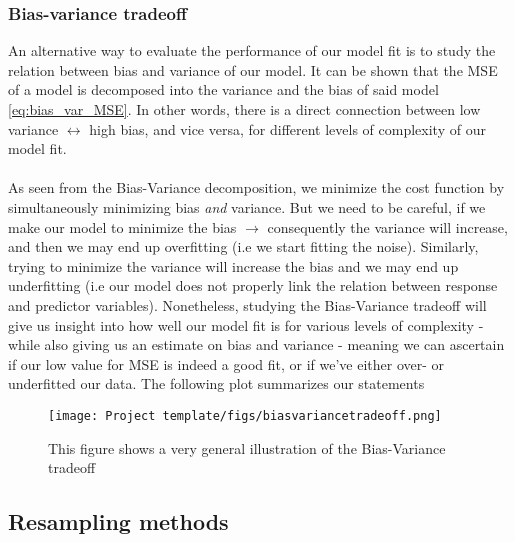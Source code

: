\documentclass[../main.tex]{subfiles}
\begin{document}
\subsubsection{Bias-variance tradeoff}\label{refmethod:Bias_variance_tradeoff}
An alternative way to evaluate the performance of our model fit is to study the relation between bias and variance of our model. It can be shown that the MSE of a model is decomposed into the variance and the bias of said model \eqref{eq:bias_var_MSE}. In other words, there is a direct connection between low variance $\leftrightarrow$ high bias, and vice versa, for different levels of complexity of our model fit. 
\\\\\indent As seen from the Bias-Variance decomposition, we minimize the cost function by simultaneously minimizing bias \emph{and} variance. But we need to be careful, if we make our model to minimize the bias $\rightarrow$ consequently the variance will increase, and then we may end up overfitting (i.e we start fitting the noise). Similarly, trying to minimize the variance will increase the bias and we may end up underfitting (i.e our model does not properly link the relation between response and predictor variables). Nonetheless, studying the Bias-Variance tradeoff will give us insight into how well our model fit is for various levels of complexity - while also giving us an estimate on bias and variance - meaning we can ascertain if our low value for MSE is indeed a good fit, or if we've either over- or underfitted our data. The following plot summarizes our statements
\begin{figure}[h!]
    \centering
    \texttt{[image: Project template/figs/biasvariancetradeoff.png]}
    \caption{This figure shows a very general illustration of the Bias-Variance tradeoff \footnotemark}
    \label{fig:biasvartradeoff}
\end{figure}
\newpage
\subsection{Resampling methods}\label{refmethod:resampling}
\end{document}
